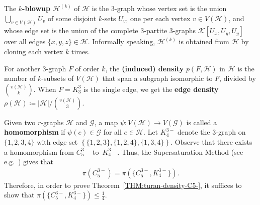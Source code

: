 \documentclass[11pt,a4paper]{article}
\theoremstyle{remark}
\newcommand{\C}[1]{\mathcal{#1}}
\newcommand{\hide}[1]{}
\begin{document}
The \textbf{$k$-blowup} $\C H^{(k)}$ of $\C H$ is the 3-graph whose vertex set is the union $\bigcup_{v\in V(\C H)} U_v$ of some disjoint $k$-sets $U_v$, one per each vertex $v\in V(\C H)$, and whose edge set is the union of the complete $3$-partite $3$-graphs $\mathcal{K}[U_x,U_y,U_y]$ over all edges $\{x,y,z\}\in\C H$. Informally speaking, $\C H^{(k)}$ is obtained from $\C H$ by cloning each vertex $k$ times.


For another $3$-graph $F$ of order $k$, the \textbf{(induced) density} $p(F,\C H)$ in $\C H$ is the number of $k$-subsets of $V(\C H)$ that span a subgraph isomorphic to $F$, divided by ${v(\C H)\choose k}$. When $F=K_3^3$ is the single edge, we get the \textbf{edge density} $\rho(\mathcal{H}) \coloneqq |\mathcal{H}|/{v(\mathcal{H})\choose 3}$.


\hide{For three pairwise disjoint parts $V_1, V_2, V_3 
\subseteq V(\mathcal{H})$, the induced $3$-partite subgraph $\mathcal{H}[V_1, V_2, V_3]$ is defined as 
\begin{align*}
    \mathcal{H}[V_1, V_2, V_3] 
    \coloneqq \left\{X\in \mathcal{H} \colon |X\cap V_i| = 1 \text{ for every } i \in [3]\right\};
\end{align*}
 equivalently, $\mathcal{H}[V_1, V_2, V_3]=\C H\cap \mathcal{K}[V_1,V_2,V_3]$.
%
}

Given two $r$-graphs $\mathcal{H}$ and $\mathcal{G}$, a map $\psi \colon V(\mathcal{H})\to V(\mathcal{G})$ is called a \textbf{homomorphism} if $\psi(e) \in \mathcal{G}$ for all $e\in \mathcal{H}$. 
Let $K_{4}^{3-}$ denote the $3$-graph on $\{1,2,3,4\}$ with edge set $\left\{\{1,2,3\},\{1,2,4\},\{1,3,4\}\right\}$. 
Observe that there exists a homomorphism from $C_{5}^{3-}$ to~$K_{4}^{3-}$. 
Thus, the Supersaturation Method (see e.g.~\cite[Theorem~2.2]{Kee11}) gives that
\begin{align}
    \pi(C_{5}^{3-}) = \pi(\{C_{5}^{3-},K_{4}^{3-}\}).\label{eq:K4} 
\end{align}
%
Therefore, in order to prove Theorem~\ref{THM:turan-density-C5-}, it suffices to show that $\pi(\{C_{5}^{3-},K_{4}^{3-}\}) \le \frac{1}{4}$. 
\end{document}

